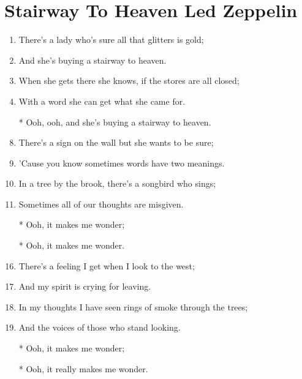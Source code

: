 \documentclass{article}
\begin{document}
    \section*{Stairway To Heaven \of  Led Zeppelin}

    \begin{center}
        \begin{enumerate}
            \item There's a lady who's sure all that glitters is gold;
            \item And she's buying a stairway to heaven.
            \item When she gets there she knows, if the stores are all closed;
            \item With a word she can get what she came for.

            \item[]
            \item[*] Ooh, ooh, and she's buying a stairway to heaven.
            \item[]

            \item There's a sign on the wall but she wants to be sure;
            \item 'Cause you know sometimes words have two meanings.
            \item In a tree by the brook, there's a songbird who sings;
            \item Sometimes all of our thoughts are misgiven.

            \item[]
            \item[*] Ooh, it makes me wonder;
            \item[*] Ooh, it makes me wonder.
            \item[] 

            \item There's a feeling I get when I look to the west;
            \item And my spirit is crying for leaving.
            \item In my thoughts I have seen rings of smoke through the trees;
            \item And the voices of those who stand looking.

            \item[]
            \item[*] Ooh, it makes me wonder;
            \item[*] Ooh, it really makes me wonder.
            \item[] 


\end{enumerate}
\end{center}
\end{document}
